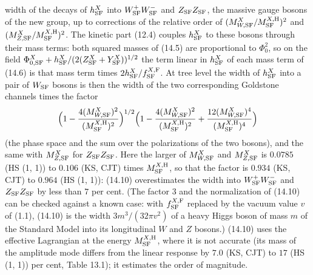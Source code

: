 \documentclass[
  10pt,
]{article}
\begin{document}
width of the decays of \(h^X_{\rm SF}\) into
\(W^+_{\rm SF}W^-_{\rm SF}\) and \(Z_{\rm SF}Z_{\rm SF}\), the massive
gauge bosons of the new group, up to corrections of the relative order
of \((M^X_{W,{\rm SF}}/M^{X,{\rm H}}_{\rm SF})^2\) and
\((M^X_{Z,{\rm SF}}/M^{X,{\rm H}}_{\rm SF})^2\). The kinetic part (12.4)
couples \(h^X_{\rm SF}\) to these bosons through their mass terms: both
squared masses of (14.5) are proportional to \(\Phi_0^2\), so on the
field
\(\Phi^X_{0,{\rm SF}}+h^X_{\rm SF}/(2(Z^X_{\rm SF}+Y^X_{\rm SF}))^{1/2}\)
the term linear in \(h^X_{\rm SF}\) of each mass term of (14.6) is that
mass term times \(2h^X_{\rm SF}/f^{X,{\rm F}}_{\rm SF}\). At tree level
the width of \(h^X_{\rm SF}\) into a pair of \(W_{\rm SF}\) bosons is
then the width of the two corresponding Goldstone channels times the
factor
\[\Big(1-\frac{4(M^X_{W,{\rm SF}})^2}{(M^{X,{\rm H}}_{\rm SF})^2}\Big)^{1/2}\Big(1-\frac{4(M^X_{W,{\rm SF}})^2}{(M^{X,{\rm H}}_{\rm SF})^2}+\frac{12(M^X_{W,{\rm SF}})^4}{(M^{X,{\rm H}}_{\rm SF})^4}\Big)\]
(the phase space and the sum over the polarizations of the two bosons),
and the same with \(M^X_{Z,{\rm SF}}\) for \(Z_{\rm SF}Z_{\rm SF}\).
Here the larger of \(M^X_{W,{\rm SF}}\) and \(M^X_{Z,{\rm SF}}\) is
\(0.0785\) (HS (1, 1)) to \(0.106\) (KS, CJT) times
\(M^{X,{\rm H}}_{\rm SF}\), so that the factor is \(0.934\) (KS, CJT) to
\(0.964\) (HS (1, 1)): (14.10) overestimates the width into
\(W^+_{\rm SF}W^-_{\rm SF}\) and \(Z_{\rm SF}Z_{\rm SF}\) by less than
\(7\) per cent. (The factor 3 and the normalization of (14.10) can be
checked against a known case: with \(f^{X,{\rm F}}_{\rm SF}\) replaced
by the vacuum value \(v\) of (1.1), (14.10) is the width
\(3m^3/(32\pi v^2)\) of a heavy Higgs boson of mass \(m\) of the
Standard Model into its longitudinal \(W\) and \(Z\) bosons.) (14.10)
uses the effective Lagrangian at the energy \(M^{X,{\rm H}}_{\rm SF}\),
where it is not accurate (its mass of the amplitude mode differs from
the linear response by \(7.0\) (KS, CJT) to \(17\) (HS (1, 1)) per cent,
Table 13.1); it estimates the order of magnitude.
\end{document}
